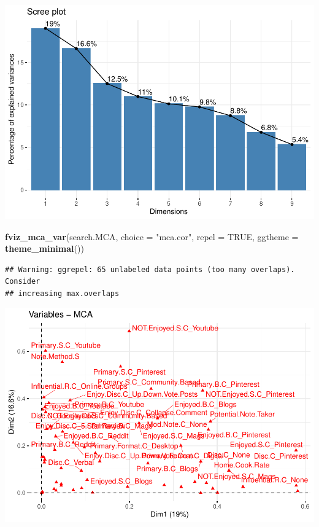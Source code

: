 \documentclass[
]{article}
\newenvironment{Shaded}{\begin{snugshade}}{\end{snugshade}}
\newcommand{\DataTypeTok}[1]{\textcolor[rgb]{0.13,0.29,0.53}{#1}}
\newcommand{\KeywordTok}[1]{\textcolor[rgb]{0.13,0.29,0.53}{\textbf{#1}}}
\newcommand{\NormalTok}[1]{#1}
\newcommand{\OtherTok}[1]{\textcolor[rgb]{0.56,0.35,0.01}{#1}}
\newcommand{\StringTok}[1]{\textcolor[rgb]{0.31,0.60,0.02}{#1}}
\begin{document}
\includegraphics{Average-User-MCA_files/figure-latex/diet yes enjoy-1.pdf}

\begin{Shaded}
\begin{Highlighting}[]
\KeywordTok{fviz_mca_var}\NormalTok{(search.MCA, }\DataTypeTok{choice =} \StringTok{"mca.cor"}\NormalTok{, }\DataTypeTok{repel =} \OtherTok{TRUE}\NormalTok{,}
             \DataTypeTok{ggtheme =} \KeywordTok{theme_minimal}\NormalTok{())}
\end{Highlighting}
\end{Shaded}

\begin{verbatim}
## Warning: ggrepel: 65 unlabeled data points (too many overlaps). Consider
## increasing max.overlaps
\end{verbatim}

\includegraphics{Average-User-MCA_files/figure-latex/diet yes enjoy-2.pdf}
\end{document}
